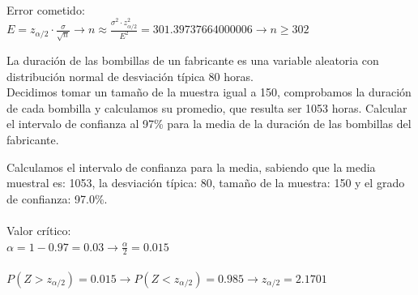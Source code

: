\documentclass[spanish, 11pt]{exam}
\begin{document}
\begin{questions}
\begin{solution}
 \\
    Error cometido: \\ $E=z_{\alpha/2}\cdot \frac{\sigma}{\sqrt{n}} \to n \approx \frac{\sigma^2 \cdot z_{\alpha / 2}^2}{E^2}=301.39737664000006 \to n \geq302$ \\    \end{solution}\question La duración de las bombillas de un fabricante es una variable aleatoria con distribución
normal de desviación típica 80 horas. \\ Decidimos tomar un tamaño de la muestra igual a 150, comprobamos la duración de cada
bombilla y calculamos su promedio, que resulta ser 1053 horas. Calcular el intervalo de confianza al 97\%
para la media de la duración de las bombillas del fabricante. \begin{solution}   Calculamos el intervalo de confianza para la media, sabiendo que la media muestral es: 1053, la desviación típica: 80, tamaño de la muestra: 150 y el grado de confianza: 97.0\%. \\ \\ Valor crítico: \\ $\alpha=1-0.97=0.03\to \frac{\alpha}{2}=0.015$ \\ \\ $P(Z>z_{\alpha/2})=0.015\to P(Z<z_{\alpha/2})=0.985 \to z_{\alpha/2} =2.1701$ \\ 
     \\

\end{solution}
\end{questions}
\end{document}
